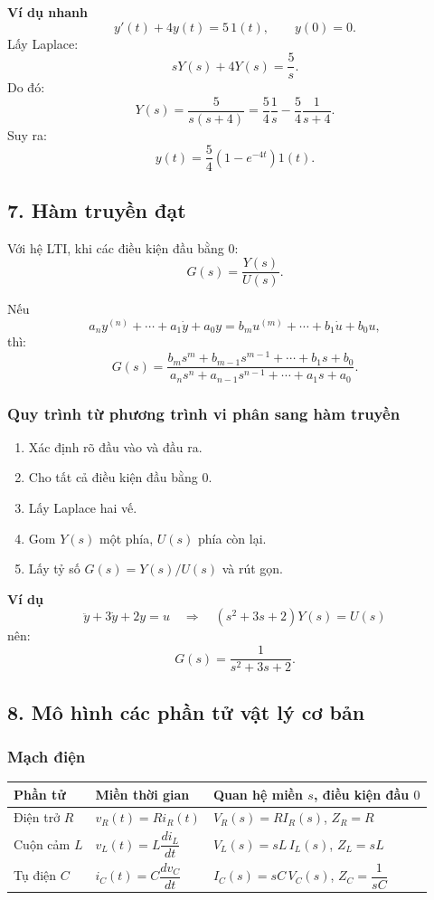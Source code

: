 \textbf{Ví dụ nhanh}
\[
y'(t)+4y(t)=5\,1(t),\qquad y(0)=0.
\]
Lấy Laplace:
\[
sY(s)+4Y(s)=\frac{5}{s}.
\]
Do đó:
\[
Y(s)=\frac{5}{s(s+4)}
=\frac54\frac1s-\frac54\frac1{s+4}.
\]
Suy ra:
\[
\boxed{y(t)=\frac54\left(1-e^{-4t}\right)1(t)}.
\]

\subsection*{7. Hàm truyền đạt}

Với hệ LTI, khi các điều kiện đầu bằng $0$:
\[
\boxed{G(s)=\frac{Y(s)}{U(s)}}.
\]

Nếu
\[
a_ny^{(n)}+\cdots+a_1\dot y+a_0y
=
b_mu^{(m)}+\cdots+b_1\dot u+b_0u,
\]
thì:
\[
\boxed{
G(s)=
\frac{b_ms^m+b_{m-1}s^{m-1}+\cdots+b_1s+b_0}
{a_ns^n+a_{n-1}s^{n-1}+\cdots+a_1s+a_0}.
}
\]

\subsubsection*{Quy trình từ phương trình vi phân sang hàm truyền}

\begin{enumerate}[leftmargin=1.9em,itemsep=0.2em]
  \item Xác định rõ đầu vào và đầu ra.
  \item Cho tất cả điều kiện đầu bằng $0$.
  \item Lấy Laplace hai vế.
  \item Gom $Y(s)$ một phía, $U(s)$ phía còn lại.
  \item Lấy tỷ số $G(s)=Y(s)/U(s)$ và rút gọn.
\end{enumerate}

\textbf{Ví dụ}
\[
\ddot y+3\dot y+2y=u
\quad\Longrightarrow\quad
(s^2+3s+2)Y(s)=U(s)
\]
nên:
\[
\boxed{G(s)=\frac{1}{s^2+3s+2}}.
\]

\subsection*{8. Mô hình các phần tử vật lý cơ bản}

\subsubsection*{Mạch điện}

\begin{center}
\small
\begin{tabular}{|p{}|p{}|p{}|}
\hline
\textbf{Phần tử} & \textbf{Miền thời gian} & \textbf{Quan hệ miền $s$, điều kiện đầu $0$}\\
\hline
Điện trở $R$ & $v_R(t)=Ri_R(t)$ & $V_R(s)=RI_R(s)$, $Z_R=R$\\
\hline
Cuộn cảm $L$ & $v_L(t)=L\dfrac{di_L}{dt}$ & $V_L(s)=sL\,I_L(s)$, $Z_L=sL$\\
\hline
Tụ điện $C$ & $i_C(t)=C\dfrac{dv_C}{dt}$ & $I_C(s)=sC\,V_C(s)$, $Z_C=\dfrac1{sC}$\\
\hline
\end{tabular}
\end{center}

